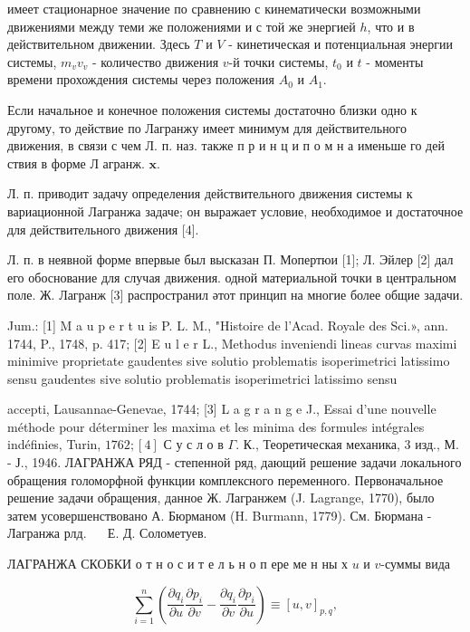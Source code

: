 \documentclass[10pt]{article}
\begin{document}
имеет стационарное значение по сравнению с кинематически возможными движениями между теми же положениями и с той же энергией $h$, что и в действительном движении. Здесь $T$ и $V$ - кинетическая и потенциальная энергии системы, $m_{v} v_{v}$ - количество движения $v$-й точки системы, $t_{0}$ и $t$ - моменты времени прохождения системы через положения $A_{0}$ и $A_{1}$.



Если начальное и конечное положения системы достаточно близки одно к другому, то действие по Лагранжу имеет минимум для действительного движения, в связи с чем Л. п. наз. также п р и н ц и п о м н а именьше го дей ствия в форме Л агранж. $\mathbf{x}$.



Л. п. приводит задачу определения действительного движения системы к вариационной Лагранжа задаче; он выражает условие, необходимое и достаточное для действительного движения [4].



Л. п. в неявной форме впервые был высказан П. Мопертюи [1]; Л. Эйлер [2] дал его обоснование для случая движения. одной материальной точки в центральном поле. Ж. Лагранж [3] распространил әтот принцип на многие более общие задачи.



Jum.: [1] M a u p e r t u is P. L. M., "Histoire de l'Acad. Royale des Sci.», ann. 1744, P., 1748, p. 417; [2] E u l e r L., Methodus inveniendi lineas curvas maximi minimive proprietate gaudentes sive solutio problematis isoperimetrici latissimo sensu gaudentes sive solutio problematis isoperimetrici latissimo sensu

accepti, Lausannae-Genevae, 1744; [3] L a g r a n g e J., Essai d'une nouvelle méthode pour déterminer les maxima et les minima des formules intégrales indéfinies, Turin, $1762 ;[4]$ С у с л о в $\Gamma$. К., Теоретическая механика, 3 изд., М. - Ј., 1946. ЛАГРАНЖА РЯД - степенной ряд, дающий решение задачи локального обращения голоморфной функции комплексного переменного. Первоначальное решение задачи обращения, данное Ж. Лагранжем (J. Lagrange, 1770), было затем усовершенствовано А. Бюрманом (H. Burmann, 1779). См. Бюрмана - Лагранжа рлд. $\quad$ Е. Д. Солометуев.



ЛАГРАНЖА СКОБКИ о т н о с и т е л ь н о п ере ме н ны х $u$ и $v$-суммы вида



\[

\sum_{i=1}^{n}\left(\frac{\partial q_{i}}{\partial u} \frac{\partial p_{i}}{\partial v}-\frac{\partial q_{i}}{\partial v} \frac{\partial p_{i}}{\partial u}\right) \equiv[u, v]_{p, q},

\]
\end{document}

